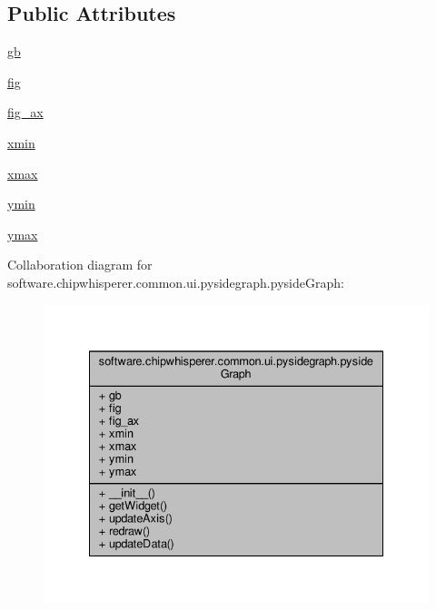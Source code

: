 \subsection*{Public Attributes}
\begin{DoxyCompactItemize}
\item 
\hyperlink{classsoftware_1_1chipwhisperer_1_1common_1_1ui_1_1pysidegraph_1_1pysideGraph_a3aefaa9cc2b430096de491cc9475f4de}{gb}
\item 
\hyperlink{classsoftware_1_1chipwhisperer_1_1common_1_1ui_1_1pysidegraph_1_1pysideGraph_a8c80cf98e638975dd3cde3d1e46c344d}{fig}
\item 
\hyperlink{classsoftware_1_1chipwhisperer_1_1common_1_1ui_1_1pysidegraph_1_1pysideGraph_ae4a11a1c7dad8512f87e7c9ebffabb46}{fig\+\_\+ax}
\item 
\hyperlink{classsoftware_1_1chipwhisperer_1_1common_1_1ui_1_1pysidegraph_1_1pysideGraph_affbe2e3bea77d4b0cd32f2d9be71bbd1}{xmin}
\item 
\hyperlink{classsoftware_1_1chipwhisperer_1_1common_1_1ui_1_1pysidegraph_1_1pysideGraph_ac3a7736676c107cf00d620ea1a81501c}{xmax}
\item 
\hyperlink{classsoftware_1_1chipwhisperer_1_1common_1_1ui_1_1pysidegraph_1_1pysideGraph_aa375bd6e4a50393a64c9f1a6e9938cbb}{ymin}
\item 
\hyperlink{classsoftware_1_1chipwhisperer_1_1common_1_1ui_1_1pysidegraph_1_1pysideGraph_a00fdd1c1b1bc39b2aa614a75d0179f13}{ymax}
\end{DoxyCompactItemize}


Collaboration diagram for software.\+chipwhisperer.\+common.\+ui.\+pysidegraph.\+pyside\+Graph\+:\nopagebreak
\begin{figure}[H]
\begin{center}
\leavevmode
\includegraphics[width=335pt]{d6/d05/classsoftware_1_1chipwhisperer_1_1common_1_1ui_1_1pysidegraph_1_1pysideGraph__coll__graph}
\end{center}
\end{figure}


